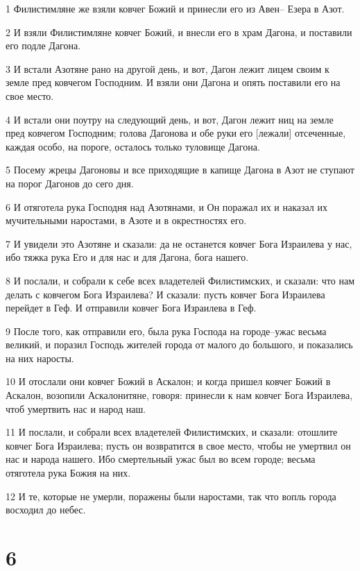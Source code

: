 \par 1 Филистимляне же взяли ковчег Божий и принесли его из Авен-- Езера в Азот.
\par 2 И взяли Филистимляне ковчег Божий, и внесли его в храм Дагона, и поставили его подле Дагона.
\par 3 И встали Азотяне рано на другой день, и вот, Дагон лежит лицем своим к земле пред ковчегом Господним. И взяли они Дагона и опять поставили его на свое место.
\par 4 И встали они поутру на следующий день, и вот, Дагон лежит ниц на земле пред ковчегом Господним; голова Дагонова и обе руки его [лежали] отсеченные, каждая особо, на пороге, осталось только туловище Дагона.
\par 5 Посему жрецы Дагоновы и все приходящие в капище Дагона в Азот не ступают на порог Дагонов до сего дня.
\par 6 И отяготела рука Господня над Азотянами, и Он поражал их и наказал их мучительными наростами, в Азоте и в окрестностях его.
\par 7 И увидели это Азотяне и сказали: да не останется ковчег Бога Израилева у нас, ибо тяжка рука Его и для нас и для Дагона, бога нашего.
\par 8 И послали, и собрали к себе всех владетелей Филистимских, и сказали: что нам делать с ковчегом Бога Израилева? И сказали: пусть ковчег Бога Израилева перейдет в Геф. И отправили ковчег Бога Израилева в Геф.
\par 9 После того, как отправили его, была рука Господа на городе--ужас весьма великий, и поразил Господь жителей города от малого до большого, и показались на них наросты.
\par 10 И отослали они ковчег Божий в Аскалон; и когда пришел ковчег Божий в Аскалон, возопили Аскалонитяне, говоря: принесли к нам ковчег Бога Израилева, чтоб умертвить нас и народ наш.
\par 11 И послали, и собрали всех владетелей Филистимских, и сказали: отошлите ковчег Бога Израилева; пусть он возвратится в свое место, чтобы не умертвил он нас и народа нашего. Ибо смертельный ужас был во всем городе; весьма отяготела рука Божия на них.
\par 12 И те, которые не умерли, поражены были наростами, так что вопль города восходил до небес.

\chapter{6}

